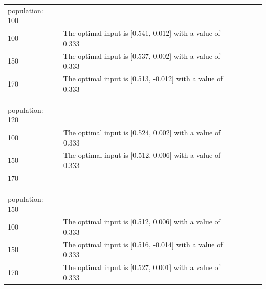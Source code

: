 \documentclass[a4paper, 12pt]{article}
\begin{document}
 
 
 \begin{table}[!h]
 	\begin{tabular}{lllll}
 		population: 100 &                                                                         &  &  &  \\
 		100      & The optimal input is [0.541, 0.012] with a value of 0.333
 		&  &  &  \\
 		150      &  The optimal input is [0.537, 0.002] with a value of 0.333
 		&  &  &  \\
 		170      & The optimal input is [0.513, -0.012] with a value of 0.333  &  &  & 
 	\end{tabular}
 \end{table}
 
 \begin{table}[!h]
 	\begin{tabular}{lllll}
 		population: 120 &                                                                         &  &  &  \\
 		100      &  The optimal input is [0.524, 0.002] with a value of 0.333  &  &  &  \\
 		150      & The optimal input is [0.512, 0.006] with a value of 0.333 &  &  &  \\
 		170      &   &  &  & 
 	\end{tabular}
 \end{table}
\newpage
 
 \begin{table}[!h]
 	\begin{tabular}{lllll}
 		population: 150 &                                                                         &  &  &  \\
 		100      & The optimal input is [0.512, 0.006] with a value of 0.333    &  &  &  \\
 		150      &  The optimal input is [0.516, -0.014] with a value of 0.333 &  &  &  \\
 		170      &  The optimal input is [0.527, 0.001] with a value of 0.333 &  &  & 
 	\end{tabular}
 \end{table}
\end{document}
